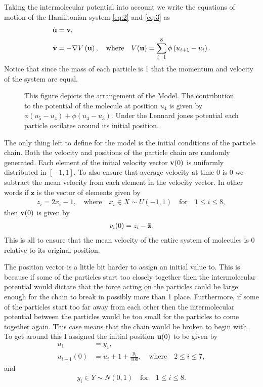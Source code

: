 Taking the intermolecular potential into account we write the equations of motion of the Hamiltonian system \eqref{eq:2} and \eqref{eq:3} as 
\begin{align*}
\dot{\mathbf{u}} &= \mathbf{v},\\
\dot{\mathbf{v}} &=  -\nabla V\left(\mathbf{u} \right), \quad  \text{where} \quad V(\mathbf{u})=\sum_{i=1}^{8}\phi\left( u_{i+1}-u_{i}\right).
\end{align*}
Notice that since the mass of each particle is 1 that the momentum and velocity of the system are equal. \\


 \begin{figure}[h]
\centering
\def\svgscale{0.55}

\caption{This figure depicts the arrangement of the Model. The contribution to the potential of the molecule at position $u_4$ is given by $\phi(u_5-u_4)+\phi(u_4-u_3)$. Under the Lennard jones potential each particle oscilates around its initial position.} \label{figure:4}
\end{figure}


The only thing left to define for the model is the initial conditions of the particle chain. Both the velocity and positions of the particle chain are randomly generated. Each element of the initial velocity vector $\mathbf{v}(0)$ is uniformly distributed in $\left [ -1, 1  \right ]$. To also ensure that average velocity at time 0 is 0 we subtract the mean velocity from each element in the velocity vector. In other words if $\mathbf{z}$ is the vector of elements given by
\begin{align*}
z_i = 2x_i-1,\quad \text{where} \quad    x_i\in X\sim U(-1,1) \quad \text{for} \quad 1\leq i \leq 8, 
\end{align*}
 then $\mathbf{v}(0)$ is given by 
 \begin{align*}
 v_i(0) = z_i - \bar{\mathbf{z}}.
 \end{align*}
This is all to ensure that the mean velocity of the entire system of molecules is 0 relative to its original position. 

The position vector is a little bit harder to assign an initial value to. This is because if some of the particles start too closely together then the intermolecular potential would dictate that the force acting on the particles could be large enough for the chain to break in possibly more than 1 place. Furthermore, if some of the particles start too far away from each other then the intermolecular potential between the particles would be too small for the particles to come together again. This case means that the chain would be broken to begin with. To get around this I assigned the initial position $\mathbf{u}(0)$ to be given by\begin{align*}
u_{1} &= y_1,\\
u_{i+1}(0) &= u_{i}+1+\frac{y_i}{100}, \quad \text{where} \quad  2 \leq i \leq 7,
\end{align*}
and\begin{align*}
y_i \in Y\sim N(0,1) \quad \text{for} \quad 1\leq i\leq 8. 
\end{align*}

